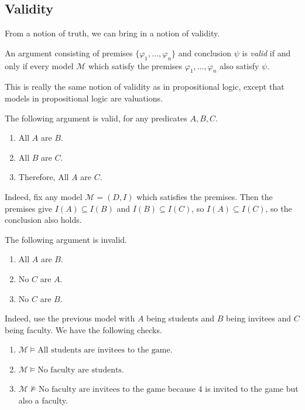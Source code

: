 \subsection{Validity}
From a notion of truth, we can bring in a notion of validity.
\begin{definition}[Valid]
	An argument consisting of premises $\{\varphi_1,\ldots,\varphi_n\}$ and conclusion $\psi$ is \textit{valid} if and only if every model $\mathcal M$ which satisfy the premises $\varphi_1,\ldots,\varphi_n$ also satisfy $\psi$.
\end{definition}
\begin{remark}
	This is really the same notion of validity as in propositional logic, except that models in propositional logic are valuations.
\end{remark}
\begin{ex}
	The following argument is valid, for any predicates $A,B,C$.
	\begin{enumerate}
		\item \textrm{All $A$ are $B$}.
		\item \textrm{All $B$ are $C$}.
		\item Therefore, \textrm{All $A$ are $C$}.
	\end{enumerate}
	Indeed, fix any model $\mathcal M=(D,I)$ which satisfies the premises. Then the premises give $I(A)\subseteq I(B)$ and $I(B)\subseteq I(C)$, so $I(A)\subseteq I(C)$, so the conclusion also holds.
\end{ex}
\begin{nex}
	The following argument is invalid.
	\begin{enumerate}
		\item \textrm{All $A$ are $B$}.
		\item \textrm{No $C$ are $A$}.
		\item \textrm{No $C$ are $B$}.
	\end{enumerate}
	Indeed, use the previous model with $A$ being students and $B$ being invitees and $C$ being faculty. We have the following checks.
	\begin{enumerate}
		\item $\mathcal M\models\textrm{All students are invitees to the game}$.
		\item $\mathcal M\models\textrm{No faculty are students}$.
		\item $\mathcal M\not\models\textrm{No faculty are invitees to the game}$ because $4$ is invited to the game but also a faculty.
	\end{enumerate}
\end{nex}
